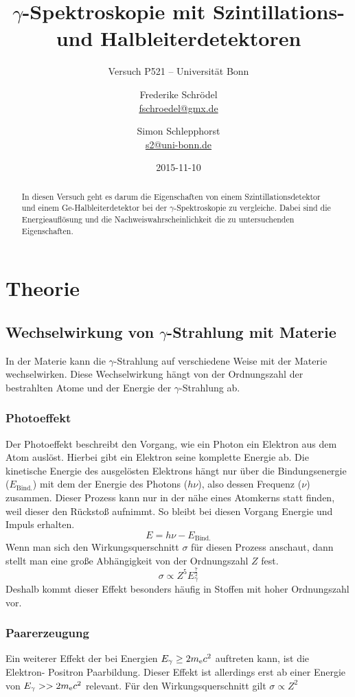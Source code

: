 \documentclass[11pt, ngerman, fleqn, DIV=15, headinclude, BCOR=2cm]{scrreprt}
\title{$\gamma$-Spektroskopie mit Szintillations- und Halbleiterdetektoren}
\subtitle{Versuch P521 -- Universität Bonn}
\author{
	Frederike Schrödel \\
	\small{\href{mailto:fschroedel@gmx.de}{fschroedel@gmx.de}}
	\and
	Simon Schlepphorst \\
	\small{\href{mailto:s2@uni-bonn.de}{s2@uni-bonn.de}}
}
\date{2015-11-10}
\begin{document}
\maketitle

\begin{abstract}
In diesen Versuch geht es darum die Eigenschaften von einem
Szintillationsdetektor und einem Ge-Halbleiterdetektor bei der
$\gamma$-Spektroskopie zu vergleiche.
Dabei sind die Energieauflösung und die Nachweiswahrscheinlichkeit die
zu untersuchenden Eigenschaften.
\end{abstract}


\tableofcontents

\chapter{Theorie}

\section{Wechselwirkung von $\gamma$-Strahlung mit Materie}
In der Materie kann die $\gamma$-Strahlung auf verschiedene Weise mit der
Materie wechselwirken. 
Diese Wechselwirkung hängt von der Ordnungszahl der bestrahlten Atome und der Energie
der $\gamma$-Strahlung ab.

\subsection{Photoeffekt}
Der Photoeffekt beschreibt den Vorgang, wie ein Photon ein Elektron aus dem
Atom auslöst. 
Hierbei gibt ein Elektron seine komplette Energie ab.
Die kinetische Energie des ausgelösten Elektrons hängt nur über die
Bindungsenergie ($E_\text{Bind.}$) mit dem der Energie des Photons ($h\nu$), also dessen Frequenz ($\nu$) zusammen.
Dieser Prozess kann nur in der nähe eines Atomkerns statt finden, weil dieser
den Rückstoß aufnimmt.
So bleibt bei diesen Vorgang Energie und Impuls erhalten. 
\[ 
    E = h\nu - E_\text{Bind.}
\]
Wenn man sich den Wirkungsquerschnitt $\sigma$ für diesen Prozess anschaut,
dann stellt man eine große Abhängigkeit von der Ordnungszahl $Z$ fest.
\[
    \sigma \propto Z^5 E_\gamma^{\frac 72}
\]
Deshalb kommt dieser Effekt besonders häufig in Stoffen mit hoher Ordnungszahl
vor.

\subsection{Paarerzeugung}
Ein weiterer Effekt der bei Energien $E_\gamma \ge 2m_\text ec^2$ auftreten
kann, ist die Elektron- Positron Paarbildung.
Dieser Effekt ist allerdings erst ab einer Energie von $E_\gamma >> 2m_\text
ec^2$ relevant.
Für den Wirkungsquerschnitt gilt $\sigma \propto Z^2$
\end{document}
